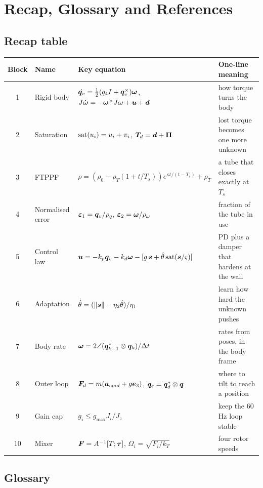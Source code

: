 \section{Recap, Glossary and References}
\label{sec:appendix}

\subsection{Recap table}
\label{sec:recap}

\begin{center}\small
\begin{longtable}{@{}c p{3.2cm} p{6.0cm} p{4.6cm}@{}}
\toprule
\textbf{Block} & \textbf{Name} & \textbf{Key equation} & \textbf{One-line meaning}\\
\midrule\endhead
1 & Rigid body & $\dot{\bm{q}_v}=\tfrac12(q_4I+\bm{q}_v^\times)\bm{\omega}$, $J\dot{\bm{\omega}}=-\bm{\omega}^\times J\bm{\omega}+\bm{u}+\bm{d}$ & how torque turns the body\\
2 & Saturation & $\operatorname{sat}(u_i)=u_i+\pi_i$, $\bm T_d=\bm{d}+\bm\Pi$ & lost torque becomes one more unknown\\
3 & FTPPF & $\rho=(\rho_0-\rho_T(1+t/T_s))e^{\kappa t/(t-T_s)}+\rho_T$ & a tube that closes exactly at $T_s$\\
4 & Normalised error & $\bm{\varepsilon}_1=\bm{q}_v/\rho_q$, $\bm{\varepsilon}_2=\bm{\omega}/\rho_\omega$ & fraction of the tube in use\\
5 & Control law & $\bm{u}=-k_p\bm{q}_v-k_d\bm{\omega}-[g\,\bm{s}+\hat{\theta}\operatorname{sat}(\bm{s}/\varsigma)]$ & PD plus a damper that hardens at the wall\\
6 & Adaptation & $\dot{\hat{\theta}}=(\|\bm{s}\|-\eta_2\hat{\theta})/\eta_1$ & learn how hard the unknown pushes\\
7 & Body rate & $\bm{\omega}=2\angle(\bm{q}_{k-1}^*\otimes\bm{q}_k)/\Delta t$ & rates from poses, in the body frame\\
8 & Outer loop & $\bm{F}_d=m(\bm a_{cmd}+g\bm e_3)$, $\bm{q}_e=\bm{q}_d^*\otimes\bm{q}$ & where to tilt to reach a position\\
9 & Gain cap & $g_i\le g_{\max}J_i/J_z$ & keep the 60\,Hz loop stable\\
10 & Mixer & $\bm{F}=A^{-1}[T;\bm{\tau}]$, $\Omega_i=\sqrt{F_i/k_T}$ & four rotor speeds\\
\bottomrule
\end{longtable}
\end{center}

\subsection{Glossary}

